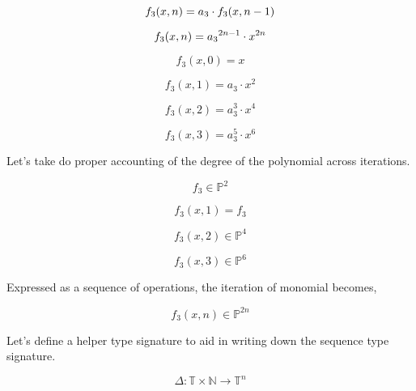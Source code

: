 \begin{equation}
    f_3(x,n) = a_3 \cdot f_3(x,n-1) \notag
\end{equation}

\begin{equation}
    f_3(x,n) = {a_3}^{2n - 1} \cdot x^{2n} \notag
\end{equation}

\begin{equation}
    f_3(x,0) = x
\end{equation}

\begin{equation}
    f_3(x,1) = a_3 \cdot x^2
\end{equation}

\begin{equation}
    f_3(x,2) = a_3^3 \cdot x^4
\end{equation}

\begin{equation}
    f_3(x,3) = a_3^5 \cdot x^6
\end{equation}

Let's take do proper accounting of the degree of the polynomial across
iterations.

\begin{equation}
    f_3 \in \mathbb{P}^2
\end{equation}

\begin{equation}
    f_3(x,1) = f_3
\end{equation}

\begin{equation}
    f_3(x,2) \in \mathbb{P}^4
\end{equation}

\begin{equation}
    f_3(x,3) \in \mathbb{P}^6
\end{equation}

Expressed as a sequence of operations, the iteration of monomial becomes,

\begin{equation}
    f_3(x,n) \in \mathbb{P}^{2n}
\end{equation}

Let's define a helper type signature to aid in writing down the sequence type
signature.

\begin{equation}
    \Delta: \mathbb{T} \times \mathbb{N} \rightarrow \mathbb{T}^n
\end{equation}

